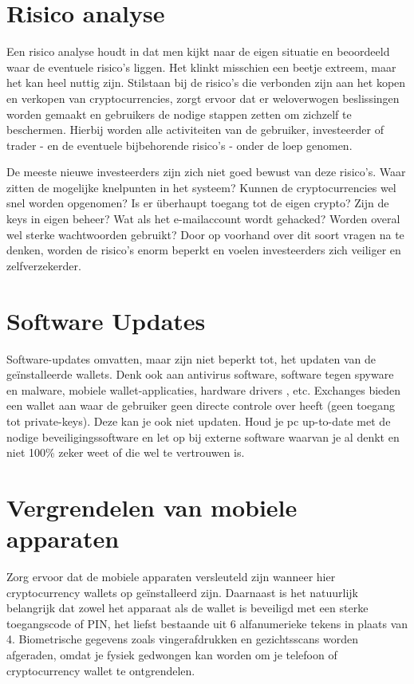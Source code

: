 \section{Risico analyse}
Een risico analyse houdt in dat men kijkt naar de eigen situatie en beoordeeld waar de eventuele risico's liggen. Het klinkt misschien een beetje extreem, maar het kan heel nuttig zijn. Stilstaan bij de risico's die verbonden zijn aan het kopen en verkopen van cryptocurrencies, zorgt ervoor dat er weloverwogen beslissingen worden gemaakt en gebruikers de nodige stappen zetten om zichzelf te beschermen. Hierbij worden alle activiteiten van de gebruiker, investeerder of trader - en de eventuele bijbehorende risico's - onder de loep genomen. 

De meeste nieuwe investeerders zijn zich niet goed bewust van deze risico's. Waar zitten de mogelijke knelpunten in het systeem? Kunnen de cryptocurrencies wel snel worden opgenomen? Is er {\"u}berhaupt toegang tot de eigen crypto? Zijn de keys in eigen beheer? Wat als het e-mailaccount wordt gehacked? Worden overal wel sterke wachtwoorden gebruikt? Door op voorhand over dit soort vragen na te denken, worden de risico's enorm beperkt en voelen investeerders zich veiliger en zelfverzekerder.

\section{Software Updates}
Software-updates omvatten, maar zijn niet beperkt tot, het updaten van de ge{\"i}nstalleerde wallets. Denk ook aan antivirus software, software tegen spyware en malware, mobiele wallet-applicaties, hardware drivers , etc. Exchanges bieden een wallet aan waar de gebruiker geen directe controle over heeft (geen toegang tot private-keys). Deze kan je ook niet updaten. Houd je pc up-to-date met de nodige beveiligingssoftware en let op bij externe software waarvan je al denkt en niet 100\% zeker weet of die wel te vertrouwen is.

\section{Vergrendelen van mobiele apparaten}
Zorg ervoor dat de mobiele apparaten versleuteld zijn wanneer hier cryptocurrency wallets op ge{\"i}nstalleerd zijn. Daarnaast is het natuurlijk belangrijk dat zowel het apparaat als de wallet is beveiligd met een sterke toegangscode of PIN, het liefst bestaande uit 6 alfanumerieke tekens in plaats van 4. Biometrische gegevens zoals vingerafdrukken en gezichtsscans worden afgeraden, omdat je fysiek gedwongen kan worden om je telefoon of cryptocurrency wallet te ontgrendelen.


